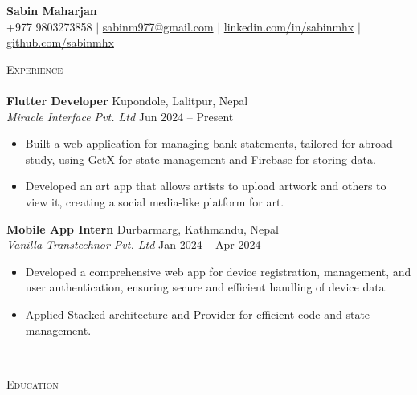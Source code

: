 \documentclass[12pt]{article}
\newcommand{\lineunder} {
    \vspace*{-8pt} \\
    \hspace*{-18pt} \hrulefill \\
}
\newcommand{\header} [1] {   
    {\hspace*{-18pt}\vspace*{6pt} \textsc{#1}}
    \vspace*{-6pt} \lineunder
}
\begin{document}
\vspace*{-40pt}


\vspace*{-10pt}
\begin{center}
    \textbf{\Huge{Sabin Maharjan}}\\
    \vspace{2mm}
    +977 9803273858 $|$ 
    \href{mailto:sabinmhx@gmail.com}{sabinm977@gmail.com} $|$ 
    \href{https://linkedin.com/in/sabinmhx}{linkedin.com/in/sabinmhx} $|$ 
    \href{https://github.com/sabinmhx}{github.com/sabinmhx} \\
\end{center}
\vspace{3mm}


\vspace{3mm}
\header{\large{Experience}}

\textbf{Flutter Developer} \hfill Kupondole, Lalitpur, Nepal\\
\textit{Miracle Interface Pvt. Ltd} \hfill Jun 2024 – Present\\
\begin{itemize} \itemsep 1pt
    \item Built a web application for managing bank statements, tailored for abroad study, using GetX for state management and Firebase for storing data.
    \item Developed an art app that allows artists to upload artwork and others to view it, creating a social media-like platform for art.
\end{itemize}

\textbf{Mobile App Intern} \hfill Durbarmarg, Kathmandu, Nepal\\
\textit{Vanilla Transtechnor Pvt. Ltd} \hfill Jan 2024 – Apr 2024\\
\begin{itemize} \itemsep 1pt
    \item Developed a comprehensive web app for device registration, management, and user authentication, ensuring secure and efficient handling of device data.
    \item Applied Stacked architecture and Provider for efficient code and state management.
\end{itemize}

\vspace{-1mm}
\


\header{\large{Education}}
\vspace{1mm}
\end{document}
